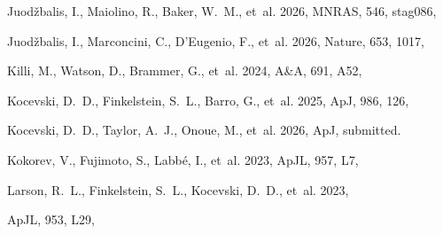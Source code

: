 \documentclass[pdflatex,sn-basic]{sn-jnl}
\providecommand{\bibinfo}[2]{}
\renewcommand{\bibinfo}[2]{}
\begin{document}
\begin{thebibliography}{}
Juod{\v{z}}balis, I., Maiolino, R., Baker, W.~M., {et~al.} 2026{},
  \bibinfo{title}{JADES: comprehensive census of broad-line AGN from
  reionization to cosmic noon revealed by JWST,} MNRAS, 546, stag086,

Juod{\v{z}}balis, I., Marconcini, C., D'Eugenio, F., {et~al.}
  2026{}, \bibinfo{title}{A direct black-hole mass measurement in a
  little red dot at high redshift,} Nature, 653, 1017,

Killi, M., Watson, D., Brammer, G., {et~al.} 2024, \bibinfo{title}{Deciphering
  the JWST spectrum of a `little red dot' at z \ensuremath{\sim} 4.53: An obscured AGN and
  its star-forming host,} A\&A, 691, A52, 

Kocevski, D.~D., Finkelstein, S.~L., Barro, G., {et~al.} 2025,
  \bibinfo{title}{The Rise of Faint, Red Active Galactic Nuclei at z > 4: A
  Sample of Little Red Dots in the JWST Extragalactic Legacy Fields,} ApJ, 986,
  126, 

Kocevski, D.~D., Taylor, A.~J., Onoue, M., {et~al.} 2026,
  \bibinfo{title}{Skyfire: A Spectroscopic Census of Little Red Dots and
  Broad-Line AGN in the CEERS Field,} ApJ, submitted.
\newblock {}

Kokorev, V., Fujimoto, S., Labb\'e, I., {et~al.} 2023,
  \bibinfo{title}{UNCOVER: A NIRSpec Identification of a Broad-line AGN at
  $z=8.50$,} ApJL, 957, L7, 

Larson, R.~L., Finkelstein, S.~L., Kocevski, D.~D., {et~al.} 2023,
  \bibinfo{title}{A CEERS Discovery of an Accreting Supermassive Black Hole 570
  Myr after the Big Bang: Identifying a Progenitor of Massive z > 6 Quasars,}
  ApJL, 953, L29, 


\end{thebibliography}
\end{document}
